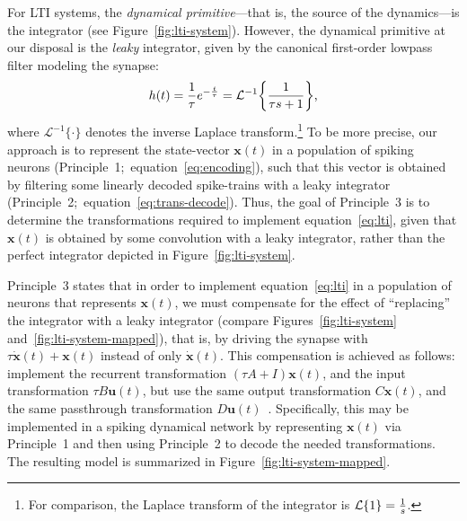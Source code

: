\documentclass[12pt]{article}
\theoremstyle{definition}
\renewcommand{\vec}{\mathbf}  %
\let\originalleft\left
\let\originalright\right
\renewcommand{\left}{\mathopen{}\mathclose\bgroup\originalleft}
\renewcommand{\right}{\aftergroup\egroup\originalright}
\begin{document}
For LTI systems, the \emph{dynamical primitive}---that is, the source of the dynamics---is the integrator (see Figure~\ref{fig:lti-system}).
However, the dynamical primitive at our disposal is the \emph{leaky} integrator, given by the canonical first-order lowpass filter modeling the synapse:
\begin{align} \label{eq:lowpass}
h(t) = \frac{1}{\tau} e^{-\frac{t}{\tau}} = \mathcal{L}^{-1}\left\{ \frac{1}{\tau s + 1} \right\} \text{,}
\end{align}
where $\mathcal{L}^{-1}\{ \cdot \}$ denotes the inverse Laplace transform.\footnote{
For comparison, the Laplace transform of the integrator is $\mathcal{L}\left\{ 1 \right\} = \frac{1}{s}$.}
To be more precise, our approach is to represent the state-vector $\vec{x}(t)$ in a population of spiking neurons (Principle~1;~equation~\ref{eq:encoding}), such that this vector is obtained by filtering some linearly decoded spike-trains with a leaky integrator (Principle~2;~equation~\ref{eq:trans-decode}).
Thus, the goal of Principle~3 is to determine the transformations required to implement equation~\ref{eq:lti}, given that $\vec{x}(t)$ is obtained by some convolution with a leaky integrator, rather than the perfect integrator depicted in Figure~\ref{fig:lti-system}.

Principle~3 states that in order to implement equation~\ref{eq:lti} in a population of neurons that represents $\vec{x}(t)$, we must compensate for the effect of ``replacing'' the integrator with a leaky integrator (compare Figures~\ref{fig:lti-system} and~\ref{fig:lti-system-mapped}), that is, by driving the synapse with $\tau \dot{\vec{x}}(t) + \vec{x}(t)$ instead of only $\dot{\vec{x}}(t)$.
This compensation is achieved as follows: implement the recurrent transformation $(\tau A + I)\vec{x}(t)$, and the input transformation $\tau B \vec{u}(t)$, but use the same output transformation $C\vec{x}(t)$, and the same passthrough transformation $D\vec{u}(t)$~\citep[][pp.~221--225]{eliasmith2003neural}.
Specifically, this may be implemented in a spiking dynamical network by representing $\vec{x}(t)$ via Principle~1 and then using Principle~2 to decode the needed transformations.
The resulting model is summarized in Figure~\ref{fig:lti-system-mapped}.
\end{document}
